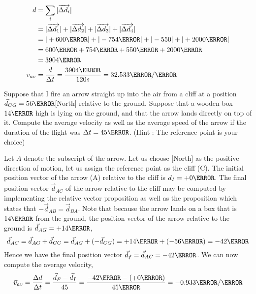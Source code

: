 \documentclass[12pt]{article} %
\begin{document}
\begin{qstn}[9]
\begin{soln}
\begin{align*}
	d &= \sum_i |\overrightarrow{\Delta d_i}|\\
	&= |\overrightarrow{\Delta d_1}| + |\overrightarrow{\Delta d_2}| +|\overrightarrow{\Delta d_3}| + |\overrightarrow{\Delta d_4}|\\
	&= |+600\m| + |-754\m| + |-550| + |+2000\m|\\
	&= 600\m  + 754\m + 550\m + 2000\m\\
	&= 3904\m \\
	v_{av} &= \frac{d}{\Delta t} = \frac{3904\m}{120s} = 32.533 \m / \s
\end{align*}
\end{soln}




\end{qstn}

\begin{qstn}[10]
Suppose that I fire an arrow straight up into the air from a cliff at a position $\vec d_{CG} = 56\m$[North] relative to the ground. Suppose that a wooden box $14\m$ high is lying on the ground, and that the arrow lands directly on top of it. Compute the average velocity as well as the average speed of the arrow if the duration of the flight was $\Delta t = 45\s$. (Hint : The reference point is your choice)


\begin{soln}
	Let $A$ denote the subscript of the arrow. Let us choose [North] as the positive direction of motion, let us assign the reference point as the cliff (C). The initial position vector of the arrow (A) relative to the cliff is $d_I = +0\m$. The final position vector $\vec d_{AC}$ of the arrow relative to the cliff may be computed by implementing the relative vector proposition as well as the proposition which states that $-\vec d_{AB} = \vec d_{BA}$. Note that because the arrow lands on a box that is $14\m$ from the ground, the position vector of the arrow relative to the ground is $\vec d_{AG} = +14\m$,
	$$\vec d_{AC} = \vec d_{AG} + \vec d_{GC} =  \vec d_{AG} + (-\vec d_{CG}) = +14\m + (-56\m) = -42\m$$ 
	Hence we have the final position vector $\vec d_f = \vec d_{AC} = -42\m$. We can now compute the average velocity,
	$$\vec v_{av} = \frac{\Delta d}{\Delta t} = \frac{\vec d_F - \vec d_I}{45} = \frac{-42\m - (+0\m)}{45\s} = -0.933 \m / \s$$
\end{soln}



\end{qstn}
\end{document}
